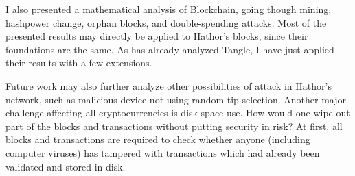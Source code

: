 I also presented a mathematical analysis of Blockchain, going though mining, hashpower change, orphan blocks, and double-spending attacks. Most of the presented results may directly be applied to Hathor's blocks, since their foundations are the same. As \citet{tangle2016} has already analyzed Tangle, I have just applied their results with a few extensions.

Future work may also further analyze other possibilities of attack in Hathor's network, such as malicious device not using random tip selection. Another major challenge affecting all cryptocurrencies is disk space use. How would one wipe out part of the blocks and transactions without putting security in risk? At first, all blocks and transactions are required to check whether anyone (including computer viruses) has tampered with transactions which had already been validated and stored in disk.











